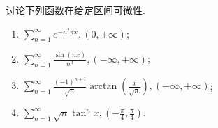 \documentclass[../../main.tex]{subfiles}
\begin{document}
\begin{example}
讨论下列函数在给定区间可微性.
\begin{enumerate}
\item \(\sum_{n=1}^{\infty} e^{-n^2 \pi x}, (0, +\infty)\);

\item \(\sum_{n=1}^{\infty} \frac{\sin(nx)}{n^3}, (-\infty, +\infty)\);

\item \(\sum_{n=1}^{\infty} \frac{(-1)^{n+1}}{\sqrt{n}} \arctan \left( \frac{x}{\sqrt{n}} \right), (-\infty, +\infty)\);

\item \(\sum_{n=1}^{\infty} \sqrt{n} \tan^n x, \left( -\frac{\pi}{4}, \frac{\pi}{4} \right)\).
\end{enumerate}
\end{example}
\end{document}
